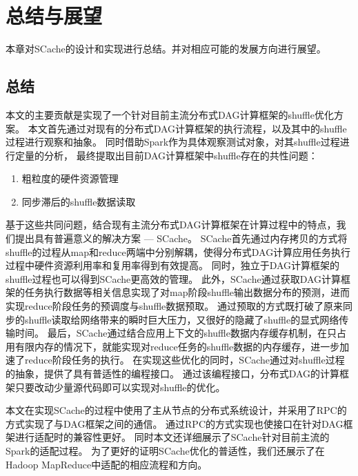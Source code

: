 
\chapter{总结与展望}
\label{chap:summary}

本章对SCache的设计和实现进行总结。并对相应可能的发展方向进行展望。

\section{总结}

本文的主要贡献是实现了一个针对目前主流分布式DAG计算框架的shuffle优化方案。
本文首先通过对现有的分布式DAG计算框架的执行流程，以及其中的shuffle过程进行观察和抽象。
同时借助Spark作为具体观察测试对象，对其shuffle过程进行定量的分析，
最终提取出目前DAG计算框架中shuffle存在的共性问题：
\begin{enumerate}
    \item 粗粒度的硬件资源管理
    \item 同步滞后的shuffle数据读取
\end{enumerate}
基于这些共同问题，结合现有主流分布式DAG计算框架在计算过程中的特点，我们提出具有普遍意义的解决方案 --- SCache。
SCache首先通过内存拷贝的方式将shuffle的过程从map和reduce两端中分别解耦，使得分布式DAG计算应用任务执行过程中硬件资源利用率和复用率得到有效提高。
同时，独立于DAG计算框架的shuffle过程也可以得到SCache更高效的管理。
此外，SCache通过获取DAG计算框架的任务执行数据等相关信息实现了对map阶段shuffle输出数据分布的预测，进而实现reduce阶段任务的预调度与shuffle数据预取。
通过预取的方式既打破了原来同步的shuffle读取给网络带来的瞬时巨大压力，又很好的隐藏了shuffle的显式网络传输时间。
最后，SCache通过结合应用上下文的shuffle数据内存缓存机制，在只占用有限内存的情况下，就能实现对reduce任务的shuffle数据的内存缓存，进一步加速了reduce阶段任务的执行。
在实现这些优化的同时，SCache通过对shuffle过程的抽象，提供了具有普适性的编程接口。
通过该编程接口，分布式DAG的计算框架只要改动少量源代码即可以实现对shuffle的优化。

本文在实现SCache的过程中使用了主从节点的分布式系统设计，并采用了RPC的方式实现了与DAG框架之间的通信。
通过RPC的方式实现也使接口在针对DAG框架进行适配时的兼容性更好。
同时本文还详细展示了SCache针对目前主流的Spark的适配过程。
为了更好的证明SCache优化的普适性，我们还展示了在Hadoop MapReduce中适配的相应流程和方向。

